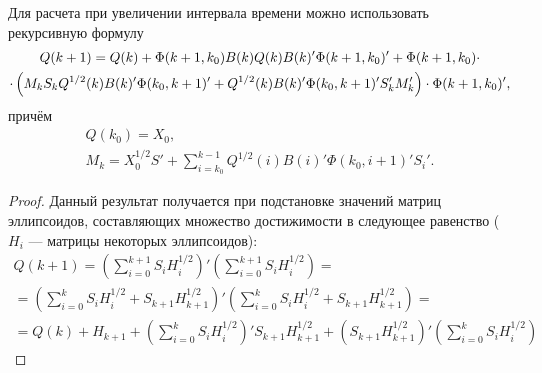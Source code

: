 \documentclass[10pt, a4paper]{article}
\begin{document}
\begin{theorem}
Для расчета при увеличении интервала времени можно использовать рекурсивную формулу
	\begin{gather}
		\notag Q(k+1) = Q(k) + \Phi(k+1,k_0)B(k)Q(k)B(k)'\Phi(k+1,k_0)' + \Phi(k+1,k_0)\cdot \\
		\cdot \left( M_k S_k Q^{1/2}(k)B(k)'\Phi(k_0,k+1)' + Q^{1/2}(k)B(k)'\Phi(k_0,k+1)'S_k'M_k' \right) \cdot \Phi(k+1,k_0)',
	\end{gather}
	причём
	\begin{gather}
		Q(k_0) = X_0,\\
		M_k = X_0^{1/2}S'+\sum\limits_{i=k_0}^{k-1}Q^{1/2}(i)B(i)'\Phi(k_0,i+1)'S_i'.
	\end{gather}
\end{theorem}
\begin{proof}
Данный результат получается при подстановке значений матриц эллипсоидов, составляющих множество достижимости в следующее равенство ($H_i$ --- матрицы некоторых эллипсоидов):
\begin{gather}
	Q(k+1) = \left(\sum\limits_{i=0}^{k+1}S_iH_i^{1/2}\right)'\left(\sum\limits_{i=0}^{k+1}S_iH_i^{1/2}\right) = \\
	= \left(\sum\limits_{i=0}^{k}S_iH_i^{1/2} + S_{k+1}H_{k+1}^{1/2} \right)'\left(\sum\limits_{i=0}^{k}S_iH_i^{1/2} + S_{k+1}H_{k+1}^{1/2}\right) = \\
	= Q(k) + H_{k+1} + \left(\sum\limits_{i=0}^{k}S_iH_i^{1/2}\right)' S_{k+1}H_{k+1}^{1/2} +
	\left(  S_{k+1}H_{k+1}^{1/2} \right)'\left(\sum\limits_{i=0}^{k}S_iH_i^{1/2}\right)
\end{gather}
\end{proof}
\end{document}
